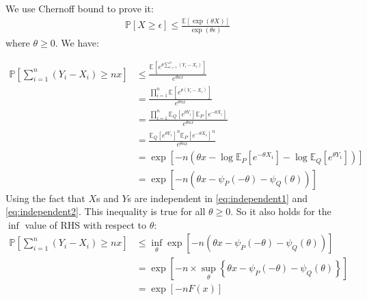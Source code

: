 \documentclass{article}
\numberwithin{equation}{section}
\newcommand{\EX}[2][]{\mathbb{E}_{#1}\left[#2\right]}%
\newcommand{\prob}[1]{\mathbb{P}\left[#1\right]}%
\begin{document}
\subsection{}
We use Chernoff bound to prove it:
\begin{align}
\prob{X \ge \epsilon} \le \frac{\EX{\exp(\theta X)}}{\exp(\theta \epsilon)}
\tag{Chernoff bound}
\end{align}
where \(\theta \ge 0\). We have:

\begin{align}
\prob{\sum_{i=1}^n (Y_i - X_i)\ge nx} &\le \frac{\EX{e^{\theta \sum_{i=1}^n (Y_i - X_i)}}}{e^{\theta nx}}\\
&= \frac{\prod_{i=1}^n \EX{e^{\theta (Y_i - X_i)}}}{e^{\theta nx}} \label{eq:independent1}\\
&= \frac{\prod_{i=1}^n \EX[Q]{e^{\theta Y_i}} \EX[P]{e^{-\theta X_i}}}{e^{\theta nx}} \label{eq:independent2}\\
&= \frac{\EX[Q]{e^{\theta Y_1}}^n \EX[P]{e^{-\theta X_1}}^n}{e^{\theta nx}}\\
&= \exp\left[-n\left( \theta x - \log \EX[P]{e^{-\theta X_1}} -\log \EX[Q]{e^{\theta Y_1}} \right) \right]\\
&= \exp\left[-n\left( \theta x - \psi_P(-\theta) - \psi_Q(\theta) \right) \right]
\end{align}
Using the fact that \(X\)s and \(Y\)s are independent in \eqref{eq:independent1} and \eqref{eq:independent2}.
This inequality is true for all \(\theta \ge 0\). So it also holds for the \(\inf\) value of RHS with respect to \(\theta\):
\begin{align}
\prob{\sum_{i=1}^n (Y_i - X_i)\ge nx} &\le \inf_\theta \exp\left[-n\left( \theta x - \psi_P(-\theta) - \psi_Q(\theta) \right) \right]\\
&= \exp\left[-n\times \sup_\theta \left\{ \theta x - \psi_P(-\theta) - \psi_Q(\theta) \right\} \right]\\
&= \exp\left[ -n F(x) \right]
\end{align}
\end{document}
